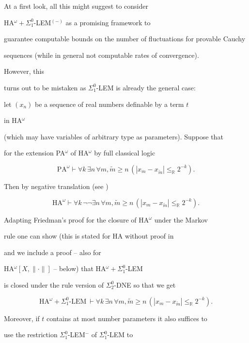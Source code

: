 \documentclass[1p]{elsarticle}
\newcommand{\RR}{\ensuremath{\mathbb{R}}}
\theoremstyle{plain}
\theoremstyle{definition}
\theoremstyle{remark}
\theoremstyle{definition}
\begin{document}
At a first look, all this might suggest to consider 

HA$^{\omega}+\Sigma^0_1$-LEM$^{(-)}$ as a promising framework to 

guarantee computable bounds on the number of fluctuations for provable Cauchy 

sequences (while in general not computable rates of convergence). 

However, this 

turns out to be mistaken as $\Sigma^0_1$-LEM is already the general case: 

let $(x_n)$ be a sequence of real numbers definable by a term $t$ 

in HA$^{\omega}$ 

(which may have variables of arbitrary type as parameters). Suppose that 

for the extension PA$^{\omega}$ of HA$^{\omega}$ by full classical logic 

\[ \mbox{PA}^{\omega}\vdash \forall k\,\exists n\,\forall m,\tilde{m}\ge n\,

(|x_m-x_{\tilde{m}}|\le_{\RR} 2^{-k}). \]

Then by negative translation (see \cite{Kohlenbach(book)}) 

\[ \mbox{HA}^{\omega}\vdash  \forall k\,\neg\neg 

\exists n\,\forall m,\tilde{m}\ge n\,

(|x_m-x_{\tilde{m}}|\le_{\RR} 2^{-k}). \]

Adapting Friedman's proof for the closure of HA$^{\omega}$ under the Markov 

rule one can show (this is stated for HA without proof in 

\cite{Hayashi/Nakata} and we include a proof -- also for 

HA$^{\omega}[X,\|\cdot\|]$ -- below) that HA$^{\omega}+

\Sigma^0_1$-LEM  

is closed under the rule version of $\Sigma^0_2$-DNE so that we get 

\[ \mbox{HA$^{\omega}+\Sigma^0_1$-LEM} \ 

\vdash \forall k\,\exists n\,\forall m,\tilde{m}\ge n\,

(|x_m-x_{\tilde{m}}|\le_{\RR} 2^{-k}). \] 

Moreover, if $t$ contains at most number parameters it also suffices to 

use the restriction $\Sigma^0_1$-LEM$^-$ of $\Sigma^0_1$-LEM to 
\end{document}
